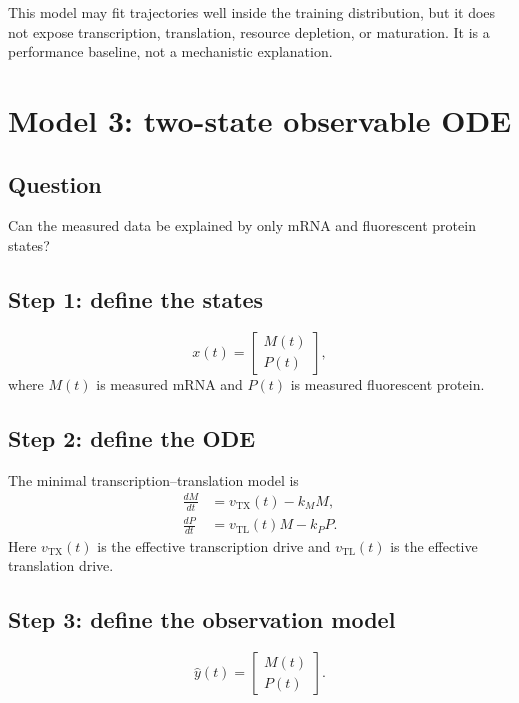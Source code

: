 \documentclass[11pt]{article}
\newcommand{\TX}{\mathrm{TX}}
\newcommand{\TL}{\mathrm{TL}}
\begin{document}
This model may fit trajectories well inside the training distribution, but it does not expose transcription, translation, resource depletion, or maturation. It is a performance baseline, not a mechanistic explanation.

\section{Model 3: two-state observable ODE}

\subsection{Question}
Can the measured data be explained by only mRNA and fluorescent protein states?

\subsection{Step 1: define the states}

\begin{equation}
    x(t)=
    \begin{bmatrix}
        M(t)\\
        P(t)
    \end{bmatrix},
\end{equation}
where $M(t)$ is measured mRNA and $P(t)$ is measured fluorescent protein.

\subsection{Step 2: define the ODE}

The minimal transcription--translation model is
\begin{align}
    \frac{dM}{dt} &= v_{\TX}(t)-k_M M, \\
    \frac{dP}{dt} &= v_{\TL}(t)M-k_P P.
\end{align}
Here $v_{\TX}(t)$ is the effective transcription drive and $v_{\TL}(t)$ is the effective translation drive.

\subsection{Step 3: define the observation model}

\begin{equation}
    \widehat{y}(t)=
    \begin{bmatrix}
        M(t)\\
        P(t)
    \end{bmatrix}.
\end{equation}
\end{document}
